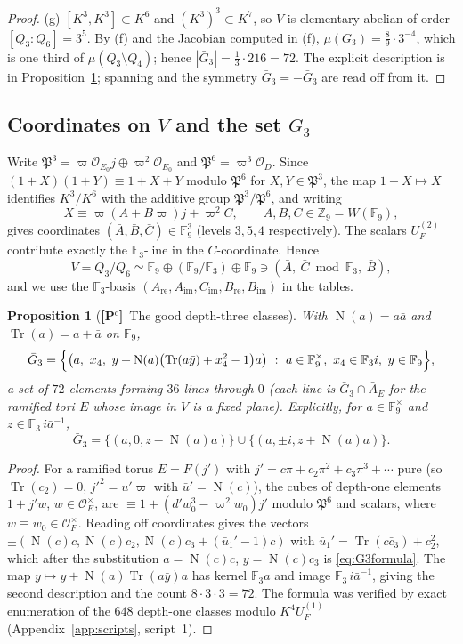\documentclass[11pt]{article}
\newcommand{\Z}{\mathbb Z}
\newcommand{\Fq}{\mathbb F}
\newcommand{\Nm}{\operatorname N}
\newcommand{\Tr}{\operatorname{Tr}}
\newcommand{\Ocal}{\mathcal O}
\newcommand{\Pfr}{\mathfrak P}
\newcommand{\Pctag}{\textnormal{\textbf{[P$^{\mathrm c}$]}}}
\theoremstyle{plain}
\newtheorem{proposition}[theorem]{Proposition}
\theoremstyle{definition}
\begin{document}
\begin{proof}
(g) $[K^3,K^3]\subset K^6$ and $(K^3)^3\subset K^7$, so $V$ is
elementary abelian of order $[Q_3:Q_6]=3^5$.  By (f) and the
Jacobian computed in (f), $\mu(G_3)=\tfrac89\cdot3^{-4}$, which is
one third of $\mu(Q_3\setminus Q_4)$; hence $|\bar G_3|=\tfrac13\cdot216=72$.
The explicit description is in Proposition~\ref{prop:G3explicit};
spanning and the symmetry $\bar G_3=-\bar G_3$ are read off from it.
\end{proof}

\subsection{Coordinates on $V$ and the set $\bar G_3$}
Write $\Pfr^3=\varpi\Ocal_{E_0}j\oplus\varpi^2\Ocal_{E_0}$ and
$\Pfr^6=\varpi^3\Ocal_D$.  Since $(1+X)(1+Y)\equiv1+X+Y$ modulo
$\Pfr^6$ for $X,Y\in\Pfr^3$, the map $1+X\mapsto X$ identifies
$K^3/K^6$ with the additive group $\Pfr^3/\Pfr^6$, and writing
\[
 X\equiv\varpi(A+B\varpi)j+\varpi^2C,\qquad A,B,C\in\Z_9=W(\Fq_9),
\]
gives coordinates $(\bar A,\bar B,\bar C)\in\Fq_9^3$ (levels $3,5,4$
respectively).  The scalars $U_F^{(2)}$ contribute exactly the
$\Fq_3$-line in the $C$-coordinate.  Hence
\begin{equation}\label{eq:Vcoords}
 V=Q_3/Q_6\simeq\Fq_9\oplus(\Fq_9/\Fq_3)\oplus\Fq_9\ni(\bar A,\ \bar C\bmod\Fq_3,\ \bar B),
\end{equation}
and we use the $\Fq_3$-basis $(A_{\mathrm{re}},A_{\mathrm{im}},C_{\mathrm{im}},B_{\mathrm{re}},B_{\mathrm{im}})$
in the tables.

\begin{proposition}[\Pctag\ The good depth-three classes]\label{prop:G3explicit}
With $\Nm(a)=a\bar a$ and $\Tr(a)=a+\bar a$ on $\Fq_9$,
\begin{equation}\label{eq:G3formula}
 \bar G_3=\Bigl\{\bigl(a,\ x_4,\ y+\Nm(a)\bigl(\Tr(a\bar y)+x_4^2-1\bigr)a\bigr)
 \ :\ a\in\Fq_9^\times,\ x_4\in\Fq_3 i,\ y\in\Fq_9\Bigr\},
\end{equation}
a set of $72$ elements forming $36$ lines through $0$ (each line is
$\bar G_3\cap\bar A_E$ for the ramified tori $E$ whose image in $V$ is
a fixed plane).  Explicitly, for $a\in\Fq_9^\times$ and $z\in\Fq_3\,i\bar a^{-1}$,
\[
 \bar G_3=\{(a,0,z-\Nm(a)a)\}\cup\{(a,\pm i,z+\Nm(a)a)\}.
\]
\end{proposition}
\begin{proof}
For a ramified torus $E=F(j')$ with $j'=c\pi+c_2\pi^2+c_3\pi^3+\cdots$
pure (so $\Tr(c_2)=0$, $j'^2=u'\varpi$ with $\bar u'=\Nm(c)$), the cubes
of depth-one elements $1+j'w$, $w\in\Ocal_E^\times$, are
$\equiv1+(d'w_0^3-\varpi^2w_0)j'$ modulo $\Pfr^6$ and scalars, where
$w\equiv w_0\in\Ocal_F^\times$.  Reading off coordinates gives the
vectors $\pm(\Nm(c)c,\Nm(c)c_2,\Nm(c)c_3+(\bar u_1'-1)c)$ with
$\bar u_1'=\Tr(c\bar c_3)+c_2^2$, which after the substitution
$a=\Nm(c)c$, $y=\Nm(c)c_3$ is \eqref{eq:G3formula}.  The map
$y\mapsto y+\Nm(a)\Tr(a\bar y)a$ has kernel $\Fq_3a$ and image
$\Fq_3\,i\bar a^{-1}$, giving the second description and the count
$8\cdot3\cdot3=72$.  The formula was verified by exact enumeration
of the $648$ depth-one classes modulo $K^4U_F^{(1)}$
(Appendix~\ref{app:scripts}, script~1).
\end{proof}
\end{document}
